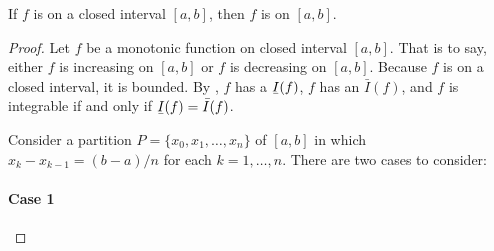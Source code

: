 \documentclass{report}
\begin{document}
\begin{theorem}[1.12]

  If $f$ is  on a closed interval $[a, b]$, then $f$
    is  on $[a, b]$.

\end{theorem}

\begin{proof}

  Let $f$ be a monotonic function on closed interval $[a, b]$.
  That is to say, either $f$ is increasing on $[a, b]$ or $f$ is decreasing on
    $[a, b]$.
  Because $f$ is on a closed interval, it is bounded.
  By , $f$ has a 
    $\ubar{I}(f)$, $f$ has an  $\bar{I}(f)$,
    and $f$ is integrable if and only if $\ubar{I}(f) = \bar{I}(f)$.

  Consider a partition $P = \{x_0, x_1, \ldots, x_n\}$ of $[a, b]$ in which
    $x_k - x_{k-1} = (b - a) / n$ for each $k = 1, \ldots, n$.
  There are two cases to consider:

  \paragraph{Case 1}%


\end{proof}
\end{document}
